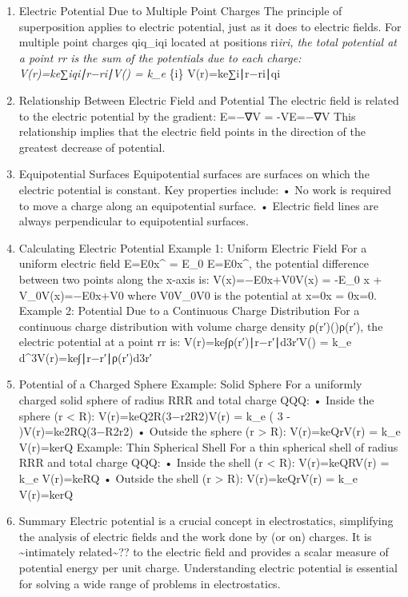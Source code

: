 \documentclass[
  letterpaper,
  DIV=11,
  numbers=noendperiod]{scrreprt}
\begin{document}
\begin{enumerate}
\def\labelenumi{\arabic{enumi}.}
\setcounter{enumi}{4}
\item
  Electric Potential Due to Multiple Point Charges The principle of
  superposition applies to electric potential, just as it does to
  electric fields. For multiple point charges qiq\_iqi located at
  positions ri\emph{iri, the total potential at a point
  rr is the sum of the potentials due to each charge:
  V(r)=ke∑iqi∣r−ri∣V() = k\_e \sum}\{i\}
  V(r)=ke∑i∣r−ri∣qi
\item
  Relationship Between Electric Field and Potential The electric field
  is related to the electric potential by the gradient: E=−∇V
  = -\nabla VE=−∇V This relationship implies that the electric field
  points in the direction of the greatest decrease of potential.
\item
  Equipotential Surfaces Equipotential surfaces are surfaces on which
  the electric potential is constant. Key properties include: • No work
  is required to move a charge along an equipotential surface. •
  Electric field lines are always perpendicular to equipotential
  surfaces.
\item
  Calculating Electric Potential Example 1: Uniform Electric Field For a
  uniform electric field E=E0x\^{} = E\_0
  E=E0x\^{}, the potential difference between two points
  along the x-axis is: V(x)=−E0x+V0V(x) = -E\_0 x + V\_0V(x)=−E0x+V0
  where V0V\_0V0 is the potential at x=0x = 0x=0. Example 2: Potential
  Due to a Continuous Charge Distribution For a continuous charge
  distribution with volume charge density ρ(r′)\rho()ρ(r′),
  the electric potential at a point rr is:
  V(r)=ke∫ρ(r′)∣r−r′∣d3r′V() = k\_e
  \int {}
  d\^{}3V(r)=ke∫∣r−r′∣ρ(r′)d3r′
\item
  Potential of a Charged Sphere Example: Solid Sphere For a uniformly
  charged solid sphere of radius RRR and total charge QQQ: • Inside the
  sphere (r \textless{} R): V(r)=keQ2R(3−r2R2)V(r) = k\_e 
  \left( 3 -  \right)V(r)=ke2RQ(3−R2r2) • Outside the
  sphere (r \textgreater{} R): V(r)=keQrV(r) = k\_e V(r)=kerQ
  Example: Thin Spherical Shell For a thin spherical shell of radius RRR
  and total charge QQQ: • Inside the shell (r \textless{} R):
  V(r)=keQRV(r) = k\_e V(r)=keRQ • Outside the shell (r
  \textgreater{} R): V(r)=keQrV(r) = k\_e V(r)=kerQ
\item
  Summary Electric potential is a crucial concept in electrostatics,
  simplifying the analysis of electric fields and the work done by (or
  on) charges. It is \textasciitilde intimately related\textasciitilde??
  to the electric field and provides a scalar measure of potential
  energy per unit charge. Understanding electric potential is essential
  for solving a wide range of problems in electrostatics.
\end{enumerate}
\end{document}
